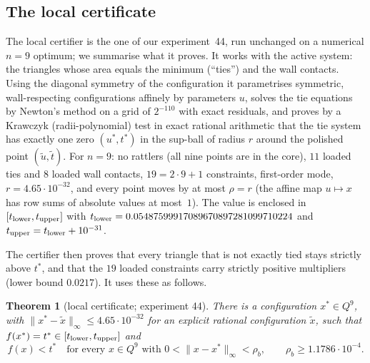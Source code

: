 \documentclass[11pt]{amsart}
\newtheorem{theorem}{Theorem}[section]
\theoremstyle{definition}
\newcommand{\tstar}{t^{*}}
\begin{document}
\subsection{The local certificate}
The local certifier is the one of our experiment~44, run unchanged on a numerical $n = 9$ optimum; we summarise what it proves. It works with the active system: the triangles whose area equals the minimum (``ties'') and the wall contacts. Using the diagonal symmetry of the configuration it parametrises symmetric, wall-respecting configurations affinely by parameters $u$, solves the tie equations by Newton's method on a grid of $2^{-110}$ with exact residuals, and proves by a Krawczyk (radii-polynomial) test in exact rational arithmetic that the tie system has exactly one zero $(u^*,\tstar)$ in the sup-ball of radius $r$ around the polished point $(\tilde u, \tilde t)$. %
For $n = 9$: no rattlers (all nine points are in the core), $11$ loaded ties and $8$ loaded wall contacts, $19 = 2\cdot 9+1$ constraints, first-order mode, $r = 4.65\cdot10^{-32}$, and every point moves by at most $\rho = r$ (the affine map $u \mapsto x$ has row sums of absolute values at most~$1$). The value is enclosed in $[t_{\rm lower}, t_{\rm upper}]$ with
$t_{\rm lower} = 0.05487599917089670897281099710224$ and $t_{\rm upper} = t_{\rm lower} + 10^{-31}$. %

The certifier then proves that every triangle that is not exactly tied stays strictly above $\tstar$, and that the $19$ loaded constraints carry strictly positive multipliers (lower bound $0.0217$). It uses these as follows. %

\begin{theorem}[local certificate; experiment 44]\label{thm:local}
There is a configuration $x^* \in Q^9$, with $\|x^* - \tilde x\|_\infty \le 4.65\cdot 10^{-32}$ for an explicit rational configuration $\tilde x$, such that $f(x^*) = \tstar \in [t_{\rm lower}, t_{\rm upper}]$ and
\[
  f(x) < \tstar \quad\text{for every } x \in Q^9 \text{ with } 0 < \|x - x^*\|_\infty < \rho_b, \qquad \rho_b \ge 1.1786\cdot10^{-4}.
\]
\end{theorem}
\end{document}
